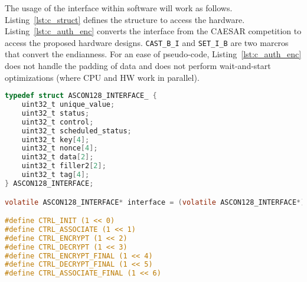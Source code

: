 \documentclass[runningheads]{llncs}
\begin{document}
The usage of the interface within software will work as follows. Listing~\ref{lst:c_struct} defines the structure to access the hardware. Listing~\ref{lst:c_auth_enc} converts the interface from the CAESAR competition to access the proposed hardware designs. \texttt{CAST\_B\_I} and  \texttt{SET\_I\_B} are two marcros that convert the endianness. For an ease of pseudo-code, Listing~\ref{lst:c_auth_enc} does not handle the padding of data and does not perform wait-and-start optimizations (where CPU and HW work in parallel). 

\begin{lstlisting}[float=htb,language=C,caption={Memory Interface defined in C. Accessible at address 0x40000000.},label=lst:c_struct,basicstyle=\footnotesize\ttfamily]
typedef struct ASCON128_INTERFACE_ {
    uint32_t unique_value;
    uint32_t status;
    uint32_t control;
    uint32_t scheduled_status;
    uint32_t key[4];
    uint32_t nonce[4];
    uint32_t data[2];
    uint32_t filler2[2];
    uint32_t tag[4]; 
} ASCON128_INTERFACE;

volatile ASCON128_INTERFACE* interface = (volatile ASCON128_INTERFACE*) 0x40000000;

#define CTRL_INIT (1 << 0)
#define CTRL_ASSOCIATE (1 << 1)
#define CTRL_ENCRYPT (1 << 2)
#define CTRL_DECRYPT (1 << 3)
#define CTRL_ENCRYPT_FINAL (1 << 4)
#define CTRL_DECRYPT_FINAL (1 << 5)
#define CTRL_ASSOCIATE_FINAL (1 << 6)
\end{lstlisting}
\end{document}
